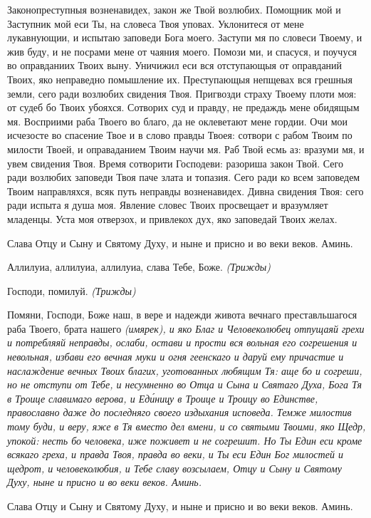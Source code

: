 Законопреступныя возненавидех, закон же Твой возлюбих. Помощник мой и
Заступник мой еси Ты, на словеса Твоя уповах. Уклонитеся от мене
лукавнующии, и испытаю заповеди Бога моего. Заступи мя по словеси
Твоему, и жив буду, и не посрами мене от чаяния моего. Помози ми, и
спасуся, и поучуся во оправданиих Твоих выну. Уничижил еси вся
отступающыя от оправданий Твоих, яко неправедно помышление их.
Преступающыя непщевах вся грешныя земли, сего ради возлюбих
свидения Твоя. Пригвозди страху Твоему плоти моя: от судеб бо Твоих
убояхся. Сотворих суд и правду, не предаждь мене обидящым мя.
Восприими раба Твоего во благо, да не оклеветают мене гордии. Очи
мои исчезосте во спасение Твое и в слово правды Твоея: сотвори с
рабом Твоим по милости Твоей, и оправаданием Твоим научи мя. Раб
Твой есмь аз: вразуми мя, и увем свидения Твоя. Время сотворити
Господеви: разориша закон Твой. Сего ради возлюбих заповеди Твоя паче
злата и топазия. Сего ради ко всем заповедем Твоим направляхся,
всяк путь неправды возненавидех. Дивна свидения Твоя: сего ради
испыта я душа моя. Явление словес Твоих просвещает и вразумляет
младенцы. Уста моя отверзох, и привлекох дух, яко заповедай Твоих
желах.
   

   Слава Отцу и Сыну и Святому Духу, и ныне и присно и во веки веков.
Аминь.


   Аллилуиа, аллилуиа, аллилуиа, слава Тебе, Боже. \itshape (Трижды)\normalfont{}


   Господи, помилуй. \itshape (Трижды)\normalfont{}


   Помяни, Господи, Боже наш, в вере и надежди живота вечнаго преставльшагося
раба Твоего, брата нашего \itshape (имярек)\normalfont{}, и яко Благ и Человеколюбец отпущаяй
грехи и потребляяй неправды, ослаби, остави и прости вся вольная его
согрешения и невольная, избави его вечная муки и огня геенскаго и даруй ему
причастие и наслаждение вечных Твоих благих, уготованных любящим Тя:
аще бо и согреши, но не отступи от Тебе, и несумненно во Отца и Сына и
Святаго Духа, Бога Тя в Троице славимаго верова, и Еди́ницу в Троице и
Троицу во Единстве, православно даже до последняго своего издыхания
исповеда. Темже милостив тому буди, и веру, яже в Тя вместо дел вмени, и со
святыми Твоими, яко Щедр, упокой: несть бо человека, иже поживет и не
согрешит. Но Ты Един еси кроме всякаго греха, и правда Твоя, правда во веки,
и Ты еси Един Бог милостей и щедрот, и человеколюбия, и Тебе славу
возсылаем, Отцу и Сыну и Святому Духу, ныне и присно и во веки веков.
Аминь.


   Слава Отцу и Сыну и Святому Духу, и ныне и присно и во веки веков.
Аминь.

